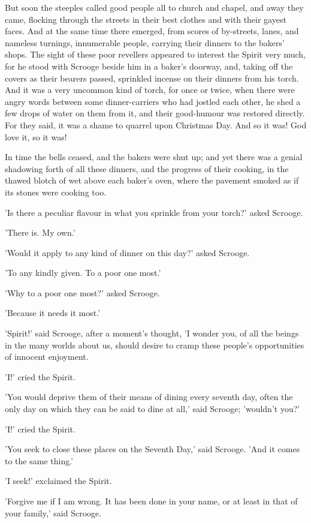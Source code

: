 But soon the steeples called good people all to church and chapel, and
away they came, flocking through the streets in their best clothes and
with their gayest faces. And at the same time there emerged, from scores
of by-streets, lanes, and nameless turnings, innumerable people,
carrying their dinners to the bakers' shops. The sight of these poor
revellers appeared to interest the Spirit very much, for he stood with
Scrooge beside him in a baker's doorway, and, taking off the covers as
their bearers passed, sprinkled incense on their dinners from his torch.
And it was a very uncommon kind of torch, for once or twice, when there
were angry words between some dinner-carriers who had jostled each
other, he shed a few drops of water on them from it, and their
good-humour was restored directly. For they said, it was a shame to
quarrel upon Christmas Day. And so it was! God love it, so it was!

In time the bells ceased, and the bakers were shut up; and yet there was
a genial shadowing forth of all these dinners, and the progress of their
cooking, in the thawed blotch of wet above each baker's oven, where the
pavement smoked as if its stones were cooking too.

'Is there a peculiar flavour in what you sprinkle from your torch?'
asked Scrooge.

'There is. My own.'

'Would it apply to any kind of dinner on this day?' asked Scrooge.

'To any kindly given. To a poor one most.'

'Why to a poor one most?' asked Scrooge.

'Because it needs it most.'

'Spirit!' said Scrooge, after a moment's thought, 'I wonder you, of all
the beings in the many worlds about us, should desire to cramp these
people's opportunities of innocent enjoyment.

'I!' cried the Spirit.

'You would deprive them of their means of dining every seventh day,
often the only day on which they can be said to dine at all,' said
Scrooge; 'wouldn't you?'

'I!' cried the Spirit.

'You seek to close these places on the Seventh Day,' said Scrooge. 'And
it comes to the same thing.'

'I seek!' exclaimed the Spirit.

'Forgive me if I am wrong. It has been done in your name, or at least in
that of your family,' said Scrooge.


